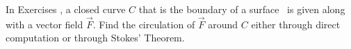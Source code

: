 {\noindent In Exercises}
{, a closed curve $C$ that is the boundary of a surface \surfaceS\ is given along with a vector field $\vec F$. Find the circulation of $\vec F$ around $C$ either through direct computation or through Stokes' Theorem.
}
